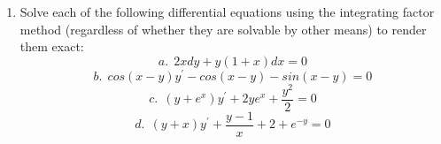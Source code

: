 \documentclass[fleqn]{article}
\begin{document}
\begin{enumerate}
    \vfill
    
    \item Solve each of the following differential equations using the integrating factor method (regardless of whether they are solvable by other means) to render them exact:
    \begin{equation*}
      a. ~~ 2xdy+y(1+x)dx=0
    \end{equation*}
    \begin{equation*}
      b. ~~ cos(x-y)y^{\prime}-cos(x-y)-sin(x-y)=0
    \end{equation*}
    \begin{equation*}
      c. ~~  (y+e^x)y^{\prime}+2ye^x+\dfrac{y^2}{2}=0
    \end{equation*}
    \begin{equation*}
      d. ~~ (y+x)y^{\prime}+\dfrac{y-1}{x}+2+e^{-y}=0
    \end{equation*}


\end{enumerate}
\end{document}
